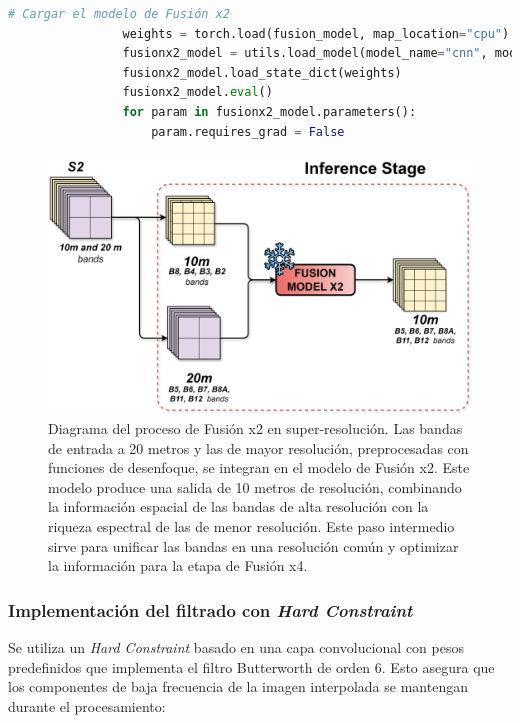             \begin{lstlisting}[language=Python]
                # Cargar el modelo de Fusión x2
                weights = torch.load(fusion_model, map_location="cpu")
                fusionx2_model = utils.load_model(model_name="cnn", model_size="medium")
                fusionx2_model.load_state_dict(weights)
                fusionx2_model.eval()
                for param in fusionx2_model.parameters():
                    param.requires_grad = False
            \end{lstlisting}

            \begin{figure}[H]
                \centering
                \includegraphics[width=0.65\linewidth]{images/inference_fusionx2.png}
                    \caption{Diagrama del proceso de Fusión x2 en super-resolución. Las bandas de entrada a 20 metros y las de mayor resolución, preprocesadas con funciones de desenfoque, se integran en el modelo de Fusión x2. Este modelo produce una salida de 10 metros de resolución, combinando la información espacial de las bandas de alta resolución con la riqueza espectral de las de menor resolución. Este paso intermedio sirve para unificar las bandas en una resolución común y optimizar la información para la etapa de Fusión x4.}

                \label{fig:fusionx4_training}
            \end{figure}


        \subsubsection{Implementación del filtrado con \textit{Hard Constraint}}

            Se utiliza un \textit{Hard Constraint} basado en una capa convolucional con pesos predefinidos que implementa el filtro Butterworth de orden 6. Esto asegura que los componentes de baja frecuencia de la imagen interpolada se mantengan durante el procesamiento:

